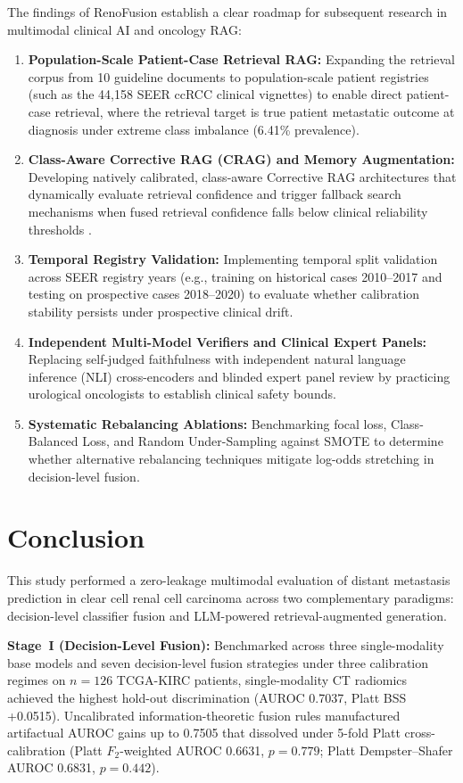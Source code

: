 The findings of RenoFusion establish a clear roadmap for subsequent research in multimodal clinical AI and oncology RAG:
\begin{enumerate}
    \item \textbf{Population-Scale Patient-Case Retrieval RAG:} Expanding the retrieval corpus from 10 guideline documents to population-scale patient registries (such as the 44,158 SEER ccRCC clinical vignettes) to enable direct patient-case retrieval, where the retrieval target is true patient metastatic outcome at diagnosis under extreme class imbalance (6.41\% prevalence).
    \item \textbf{Class-Aware Corrective RAG (CRAG) and Memory Augmentation:} Developing natively calibrated, class-aware Corrective RAG architectures that dynamically evaluate retrieval confidence and trigger fallback search mechanisms when fused retrieval confidence falls below clinical reliability thresholds \cite{yan2024corrective, modarressi2024memory}.
    \item \textbf{Temporal Registry Validation:} Implementing temporal split validation across SEER registry years (e.g., training on historical cases 2010--2017 and testing on prospective cases 2018--2020) to evaluate whether calibration stability persists under prospective clinical drift.
    \item \textbf{Independent Multi-Model Verifiers and Clinical Expert Panels:} Replacing self-judged faithfulness with independent natural language inference (NLI) cross-encoders and blinded expert panel review by practicing urological oncologists to establish clinical safety bounds.
    \item \textbf{Systematic Rebalancing Ablations:} Benchmarking focal loss, Class-Balanced Loss, and Random Under-Sampling against SMOTE to determine whether alternative rebalancing techniques mitigate log-odds stretching in decision-level fusion.
\end{enumerate}

\section{Conclusion}
\label{sec:conclusion}

This study performed a zero-leakage multimodal evaluation of distant metastasis prediction in clear cell renal cell carcinoma across two complementary paradigms: decision-level classifier fusion and LLM-powered retrieval-augmented generation.

\textbf{Stage~I (Decision-Level Fusion):} Benchmarked across three single-modality base models and seven decision-level fusion strategies under three calibration regimes on $n = 126$ TCGA-KIRC patients, single-modality CT radiomics achieved the highest hold-out discrimination (AUROC 0.7037, Platt BSS +0.0515). Uncalibrated information-theoretic fusion rules manufactured artifactual AUROC gains up to 0.7505 that dissolved under 5-fold Platt cross-calibration (Platt $F_2$-weighted AUROC 0.6631, $p = 0.779$; Platt Dempster--Shafer AUROC 0.6831, $p = 0.442$).

